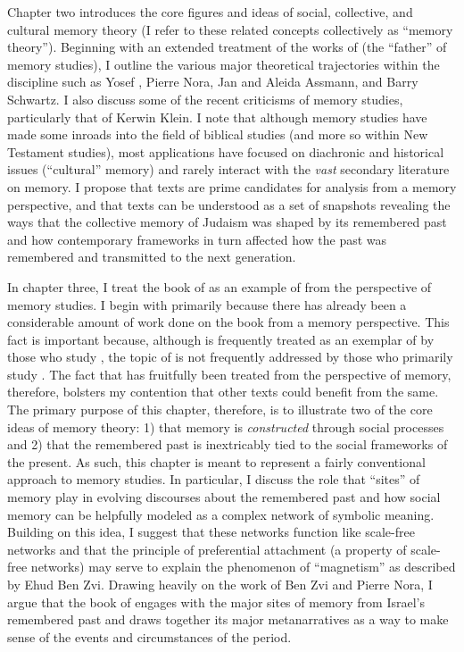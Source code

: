 Chapter two introduces the core figures and ideas of social, collective, and cultural memory theory (I refer to these related concepts collectively as ``memory theory''). Beginning with an extended treatment of the works of \Halbwachs (the ``father'' of memory studies), I outline the various major theoretical trajectories within the discipline such as Yosef \yerushalmi, Pierre Nora, Jan and Aleida Assmann, and Barry Schwartz. I also discuss some of the recent criticisms of memory studies, particularly that of Kerwin Klein. I note that although memory studies have made some inroads into the field of biblical studies (and more so within New Testament studies), most applications have focused on diachronic and historical issues (``cultural'' memory) and rarely interact with the \emph{vast} secondary literature on memory. I propose that \rwb texts are prime candidates for analysis from a memory perspective, and that \rwb texts can be understood as a set of snapshots revealing the ways that the collective memory of \secondtemple Judaism was shaped by its remembered past and how contemporary frameworks in turn affected how the past was remembered and transmitted to the next generation.

In chapter three, I treat the book of \chronicles as an example of \rwb from the perspective of memory studies. I begin with \chronicles primarily because there has already been a considerable amount of work done on the book from a memory perspective. This fact is important because, although \chronicles is frequently treated as an exemplar of \rwb by those who study \rwb, the topic of \rwb is not frequently addressed by those who primarily study \chronicles. The fact that \chronicles has fruitfully been treated from the perspective of memory, therefore, bolsters my contention that other \rwb texts could benefit from the same. The primary purpose of this chapter, therefore, is to illustrate two of the core ideas of memory theory: 1) that memory is \emph{constructed} through social processes and 2) that the remembered past is inextricably tied to the social frameworks of the present.  As such, this chapter is meant to represent a fairly conventional approach to memory studies. In particular, I discuss the role that ``sites'' of memory play in evolving discourses about the remembered past and how social memory can be helpfully modeled as a complex network of symbolic meaning. Building on this idea, I suggest that these networks function like scale-free networks and that the principle of preferential attachment (a property of scale-free networks) may serve to explain the phenomenon of ``magnetism'' as described by Ehud Ben Zvi. Drawing heavily on the work of Ben Zvi and Pierre Nora, I argue that the book of \chronicles engages with the major sites of memory from Israel's remembered past and draws together its major metanarratives as a way to make sense of the events and circumstances of the \secondtemple period.

